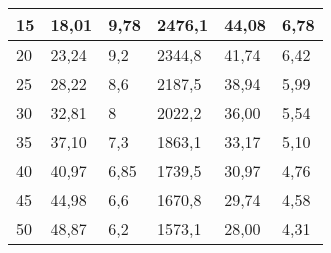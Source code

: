 \begin{table}[H]
\begin{tabular}{|l|l|l|l|l|l|}
    \rowcolor[HTML]{C6E0B4} 
    15                                    & 18,01                                  & 9,78                                               & 2476,1                                   & 44,08                                          & \cellcolor[HTML]{FFC000}6,78                                    \\ \hline
    \rowcolor[HTML]{E2EFDA} 
    20                                    & 23,24                                  & 9,2                                                & 2344,8                                   & 41,74                                          & 6,42                                     \\ \hline
    \rowcolor[HTML]{C6E0B4} 
    25                                    & 28,22                                  & 8,6                                                & 2187,5                                   & 38,94                                          & 5,99                                    \\ \hline
    \rowcolor[HTML]{E2EFDA} 
    30                                    & 32,81                                  & 8                                                  & 2022,2                                   & 36,00                                           & 5,54                                     \\ \hline
    \rowcolor[HTML]{C6E0B4} 
    35                                    & 37,10                                 & 7,3                                                & 1863,1                                   & 33,17                                          & 5,10                                    \\ \hline
    \rowcolor[HTML]{E2EFDA} 
    40                                    & 40,97                                  & 6,85                                               & 1739,5                                   & 30,97                                          & 4,76                                    \\ \hline
    \rowcolor[HTML]{C6E0B4} 
    45                                    & 44,98                                  & 6,6                                                & 1670,8                                   & 29,74                                         & 4,58                                    \\ \hline
    \rowcolor[HTML]{E2EFDA} 
    50                                    & 48,87                                  & 6,2                                                & 1573,1                                   & 28,00                                         & 4,31                                    \\ \hline
    \end{tabular}
    \end{table}

